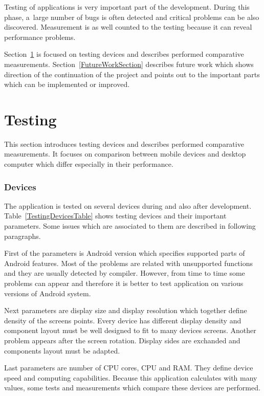 Testing of applications is very important part of the development. During this phase, a~large number of bugs is often
detected and critical problems can be also discovered. Measurement is as well counted to the testing because it can
reveal performance problems.

Section~\ref{TestingSection} is focused on testing devices and describes performed comparative measurements.
Section~\ref{FutureWorkSection} describes future work which shows direction of the continuation of the project and
points out to the important parts which can be implemented or improved.

\section{Testing}\label{TestingSection}
This section introduces testing devices and describes performed comparative measurements. It focuses on comparison
between mobile devices and desktop computer which differ especially in their performance.

\subsubsection{Devices}
The application is tested on several devices during and also after development. Table~\ref{TestingDevicesTable} shows
testing devices and their important parameters. Some issues which are associated to them are described in following
paragraphs.

First of the parameters is Android version which specifies supported parts of Android features. Most of the problems are
related with unsupported functions and they are usually detected by compiler. However, from time to time some problems
can appear and therefore it is better to test application on various versions of Android system.

Next parameters are display size and display resolution which together define density of the screens points. Every
device has different display density and component layout must be well designed to fit to many devices screens. Another
problem appears after the screen rotation. Display sides are exchanded and components layout must be adapted.

Last parameters are number of CPU cores, CPU and RAM. They define device speed and computing capabilities. Because this
application calculates with many values, some tests and measurements which compare these devices are performed.


